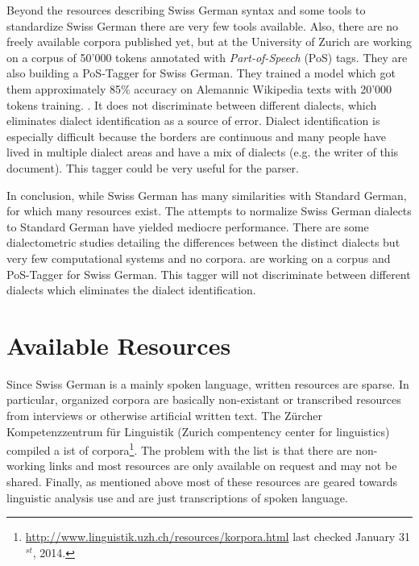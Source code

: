 \documentclass[11pt,letterpaper, covington]{article}
\begin{document}
Beyond the resources describing Swiss German syntax and some tools to standardize Swiss German there are very few tools available. Also, there are no freely available corpora published yet, but \citet{AH14} at the University of Zurich are working on a corpus of 50'000 tokens annotated with \emph{Part-of-Speech} (PoS) tags. They are also building a PoS-Tagger for Swiss German. They trained a model which got them approximately 85\% accuracy on Alemannic Wikipedia texts with 20'000 tokens training. \citep{AH12}. It does not discriminate between different dialects, which eliminates dialect identification as a source of error. Dialect identification is especially difficult because the borders are continuous and many people have lived in multiple dialect areas and have a mix of dialects (e.g. the writer of this document). This tagger could be very useful for the parser.

In conclusion, while Swiss German has many similarities with Standard German, for which many resources exist. The attempts to normalize Swiss German dialects to Standard German have yielded mediocre performance. There are some dialectometric studies detailing the differences between the distinct dialects but very few computational systems and no corpora. \citet{AH14} are working on a corpus and PoS-Tagger for Swiss German. This tagger will not discriminate between different dialects which eliminates the dialect identification.

\section{Available Resources}

Since Swiss German is a mainly spoken language, written resources are sparse. In particular, organized corpora are basically non-existant or transcribed resources from interviews or otherwise artificial written text. The Zürcher Kompetenzzentrum für Linguistik (Zurich compentency center for linguistics) compiled a ist of corpora\footnote{\url{http://www.linguistik.uzh.ch/resources/korpora.html} last checked January 31$^{st}$, 2014.}. The problem with the list is that there are non-working links and most resources are only available on request and may not be shared. Finally, as mentioned above most of these resources are geared towards linguistic analysis use and are just transcriptions of spoken language. 
\end{document}
